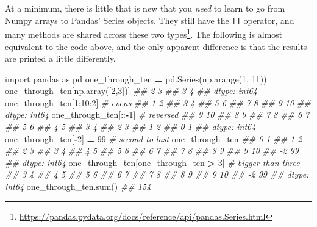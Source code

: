\documentclass[
  12pt,
  krantz2]{krantz}
\makeatletter
\newenvironment{Shaded}{\begin{snugshade}}{\end{snugshade}}
\newcommand{\BuiltInTok}[1]{#1}
\newcommand{\CommentTok}[1]{\textcolor[rgb]{0.37,0.37,0.37}{\textit{#1}}}
\newcommand{\DecValTok}[1]{\textcolor[rgb]{0.06,0.06,0.06}{#1}}
\newcommand{\ImportTok}[1]{#1}
\newcommand{\NormalTok}[1]{#1}
\newcommand{\OperatorTok}[1]{\textcolor[rgb]{0.43,0.43,0.43}{\textbf{#1}}}
\renewcommand{\href}[2]{#2\footnote{\url{#1}}}
\newenvironment{kframe}{%
\medskip{}
\setlength{\fboxsep}{.8em}
 \def\at@end@of@kframe{}%
 \ifinner\ifhmode%
  \def\at@end@of@kframe{\end{minipage}}%
  \begin{minipage}{\columnwidth}%
 \fi\fi%
 \def\FrameCommand##1{\hskip\@totalleftmargin \hskip-\fboxsep
 \colorbox{shadecolor}{##1}\hskip-\fboxsep
     \hskip-\linewidth \hskip-\@totalleftmargin \hskip\columnwidth}%
 \MakeFramed {\advance\hsize-\width
   \@totalleftmargin\z@ \linewidth\hsize
   \@setminipage}}%
 {\par\unskip\endMakeFramed%
 \at@end@of@kframe}
\renewenvironment{Shaded}{\begin{kframe}}{\end{kframe}}
\makeatother
\begin{document}
At a minimum, there is little that is new that you \emph{need} to learn to go from Numpy arrays to Pandas' Series objects. They still have the \texttt{{[}{]}} operator, and \href{https://pandas.pydata.org/docs/reference/api/pandas.Series.html}{many methods are shared across these two types}. The following is almost equivalent to the code above, and the only apparent difference is that the results are printed a little differently.

\begin{Shaded}
\begin{Highlighting}[]
\ImportTok{import}\NormalTok{ pandas }\ImportTok{as}\NormalTok{ pd}
\NormalTok{one\_through\_ten }\OperatorTok{=}\NormalTok{ pd.Series(np.arange(}\DecValTok{1}\NormalTok{, }\DecValTok{11}\NormalTok{))}
\NormalTok{one\_through\_ten[np.array([}\DecValTok{2}\NormalTok{,}\DecValTok{3}\NormalTok{])]}
\CommentTok{\#\# 2    3}
\CommentTok{\#\# 3    4}
\CommentTok{\#\# dtype: int64}
\NormalTok{one\_through\_ten[}\DecValTok{1}\NormalTok{:}\DecValTok{10}\NormalTok{:}\DecValTok{2}\NormalTok{] }\CommentTok{\# evens}
\CommentTok{\#\# 1     2}
\CommentTok{\#\# 3     4}
\CommentTok{\#\# 5     6}
\CommentTok{\#\# 7     8}
\CommentTok{\#\# 9    10}
\CommentTok{\#\# dtype: int64}
\NormalTok{one\_through\_ten[::}\OperatorTok{{-}}\DecValTok{1}\NormalTok{] }\CommentTok{\# reversed}
\CommentTok{\#\# 9    10}
\CommentTok{\#\# 8     9}
\CommentTok{\#\# 7     8}
\CommentTok{\#\# 6     7}
\CommentTok{\#\# 5     6}
\CommentTok{\#\# 4     5}
\CommentTok{\#\# 3     4}
\CommentTok{\#\# 2     3}
\CommentTok{\#\# 1     2}
\CommentTok{\#\# 0     1}
\CommentTok{\#\# dtype: int64}
\NormalTok{one\_through\_ten[}\OperatorTok{{-}}\DecValTok{2}\NormalTok{] }\OperatorTok{=} \DecValTok{99} \CommentTok{\# second to last}
\NormalTok{one\_through\_ten}
\CommentTok{\#\#  0     1}
\CommentTok{\#\#  1     2}
\CommentTok{\#\#  2     3}
\CommentTok{\#\#  3     4}
\CommentTok{\#\#  4     5}
\CommentTok{\#\#  5     6}
\CommentTok{\#\#  6     7}
\CommentTok{\#\#  7     8}
\CommentTok{\#\#  8     9}
\CommentTok{\#\#  9    10}
\CommentTok{\#\# {-}2    99}
\CommentTok{\#\# dtype: int64}
\NormalTok{one\_through\_ten[one\_through\_ten }\OperatorTok{\textgreater{}} \DecValTok{3}\NormalTok{] }\CommentTok{\# bigger than three}
\CommentTok{\#\#  3     4}
\CommentTok{\#\#  4     5}
\CommentTok{\#\#  5     6}
\CommentTok{\#\#  6     7}
\CommentTok{\#\#  7     8}
\CommentTok{\#\#  8     9}
\CommentTok{\#\#  9    10}
\CommentTok{\#\# {-}2    99}
\CommentTok{\#\# dtype: int64}
\NormalTok{one\_through\_ten.}\BuiltInTok{sum}\NormalTok{()}
\CommentTok{\#\# 154}
\end{Highlighting}
\end{Shaded}
\end{document}
